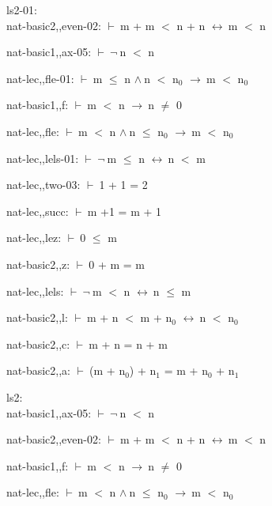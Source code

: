 \documentclass[a4paper]{article}
\newcommand{\Fol}{\mbox{$\vdash\ $}}
\newcommand{\Not}{\mbox{$\neg\ $}}
\newcommand{\And}{\mbox{$\wedge\ $}}
\newcommand{\Imp}{\mbox{$\rightarrow\ $}}
\newcommand{\Equiv}{\mbox{$\leftrightarrow\ $}}
\begin{document}
\bigskip

ls2-01:\\ nat-basic2,,even-02: 
 \Fol m + m $<$ n + n \Equiv m $<$ n



nat-basic1,,ax-05: 
 \Fol \Not n $<$ n



nat-lec,,fle-01: 
 \Fol m $\le$ n \And n $<$ $\mbox{n}_{0}$ \Imp m $<$ $\mbox{n}_{0}$



nat-basic1,,f: 
 \Fol m $<$ n \Imp n $\neq$ 0



nat-lec,,fle: 
 \Fol m $<$ n \And n $\le$ $\mbox{n}_{0}$ \Imp m $<$ $\mbox{n}_{0}$



nat-lec,,lels-01: 
 \Fol \Not m $\le$ n \Equiv n $<$ m



nat-lec,,two-03: 
 \Fol 1 + 1 = 2



nat-lec,,succ: 
 \Fol m +1 = m + 1



nat-lec,,lez: 
 \Fol 0 $\le$ m



nat-basic2,,z: 
 \Fol 0 + m = m



nat-lec,,lels: 
 \Fol \Not m $<$ n \Equiv n $\le$ m



nat-basic2,,l: 
 \Fol m + n $<$ m + $\mbox{n}_{0}$ \Equiv n $<$ $\mbox{n}_{0}$



nat-basic2,,c: 
 \Fol m + n = n + m



nat-basic2,,a: 
 \Fol (m + $\mbox{n}_{0}$) + $\mbox{n}_{1}$ = m + $\mbox{n}_{0}$ + $\mbox{n}_{1}$



\bigskip

ls2:\\ nat-basic1,,ax-05: 
 \Fol \Not n $<$ n



nat-basic2,,even-02: 
 \Fol m + m $<$ n + n \Equiv m $<$ n



nat-basic1,,f: 
 \Fol m $<$ n \Imp n $\neq$ 0



nat-lec,,fle: 
 \Fol m $<$ n \And n $\le$ $\mbox{n}_{0}$ \Imp m $<$ $\mbox{n}_{0}$
\end{document}
